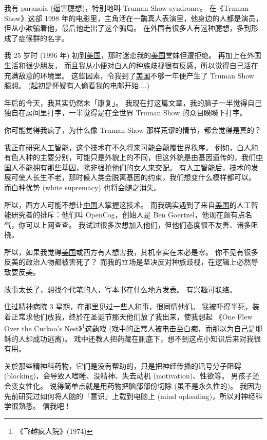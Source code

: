 \documentclass[12pt]{report}
\begin{document}
我有 paranoia (逼害臆想)，特别地叫 Truman Show syndrome。 在《Truman Show》这部 1998 年的电影里，主角活在一齣真人表演里，他身边的人都是演员，但从小欺骗着他，最后他走出了这个骗局。 在外国有很多人有这种臆想，多到形成了症候群的名字。

我 25 岁时 (1996 年) 初到\underline{美国}，那时迷恋我的\underline{美国}堂妹但遭拒绝。 再加上在外国生活和很少朋友， 而且我从小便对白人的种族歧视很有反感，所以觉得自己活在充满敌意的环境里。 这些因素，令我到了\underline{美国}不够一年便产生了 Truman Show 臆想。 (起初是怀疑有人偷看我的电邮开始....)

\resultb 年后的今天，我其实仍然未「康复」。 我现在打这篇文章，我的脑子一半觉得自己独自在房间里打字，一半觉得是在全世界 Truman Show 的众目睽睽下打字。

你可能觉得我疯了，为什么像 Truman Show 那样荒谬的情节，都会觉得是真的？

我正在研究人工智能，这个技术在不久将来可能会颠覆世界秩序。 例如，白人和有色人种的主要分别，可能只是外貌上的不同，但这外貌是由基因遗传的，我们\underline{中国}人不能拥有那些基因，除非强抢他们的女人来交配。 有人工智能后，技术的发展可使人长生不老，那时候人类会脱离基因的约束，我们想变什么模样都可以。 而白种优势 (white supremacy) 也将会随之消失。

所以，西方人可能不想让\underline{中国}人掌握这技术。 而我确实遇到了来自\underline{美国}的人工智能研究者的排斥：他们叫 OpenCog，创始人是 Ben Goertzel，他现在颇有点名气，你可以上网查查。 我试过很多次想加入他们，但他们态度很不友善、诸多阻挠。

所以，如果我觉得\underline{美国}或西方有人想害我，其机率实在未必是零。 你不见有很多反美的政治人物都被害死了？ 而我的立场是坚决反对种族歧视，在逻辑上必然导致要反美。

故事太长了，想找个代笔的人，写本书在什么地方发表。 有兴趣可联络。

住过精神病院 3 星期，在那里见过一些人和事，很同情他们。 我被吓得半死，装着正常求他们放我，终於在圣诞节那天他们放了我出来，使我想起 《One Flew Over the Cuckoo's Nest》\footnote{《飞越疯人院》(1974)}这齣戏 (戏中的正常人被电击至白痴，而那以为自己是耶稣的人却成功逃离)。 戏中还教人把药藏在脷底下，想不到这点小知识后来对我很有用。

关於那些精神科药物，它们是没有帮助的，只是把神经传播的讯号分子阻碍 (blocking)，会导致人嗜睡、没精神、失去动机 (motivation)、性欲等。 男孩子还会变女性化。 说得简单点就是用药物把脑部部份切除 (虽不是永久性的)。 我因为先前研究过如何将人脑的「意识」上载到电脑上 (mind uploading)，所以对神经科学很熟悉。 信我吧！
\end{document}
